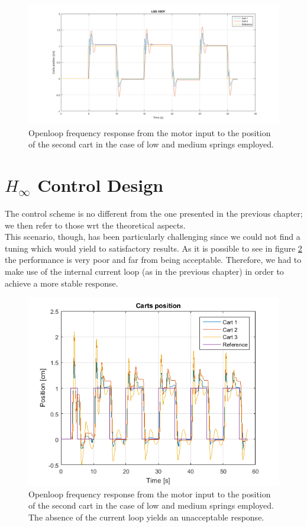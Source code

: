 \begin{figure}[h]
\centering
\includegraphics[width=0.5\linewidth]{img/lqg.png}
\caption{Openloop frequency response from the motor input to the position of the second cart in the case of low and medium springs employed.}
\label{fig:lqg3dof}
\end{figure}

\newpage

\section{$H_\infty$ Control Design}

The control scheme is no different from the one presented in the previous chapter; we then refer to those wrt the theoretical aspects.\\

This scenario, though, has been particularly challenging since we could not find a tuning which would yield to satisfactory results. As it is possible to see in figure \ref{fig:hinf13dof} the performance is very poor and far from being acceptable. Therefore, we had to make use of the internal current loop (as in the previous chapter) in order to achieve a more stable response.\\


\begin{figure}[h]
\centering
\includegraphics[width=0.5\linewidth]{img/hinf1.png}
\caption{Openloop frequency response from the motor input to the position of the second cart in the case of low and medium springs employed. The absence of the current loop yields an unacceptable response.}
\label{fig:hinf13dof}
\end{figure}

